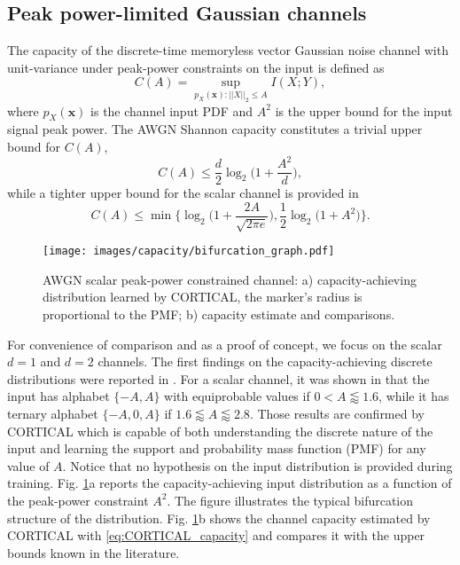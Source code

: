 \subsection{Peak power-limited Gaussian channels}
The capacity of the discrete-time memoryless vector Gaussian noise channel with unit-variance under peak-power constraints on the input is defined as \cite{Rassouli2016}
\begin{equation}
C(A) = \sup_{p_X(\mathbf{x}): ||X||_2\leq A} I(X;Y),
\end{equation}
where $p_X(\mathbf{x})$ is the channel input PDF and $A^2$ is the upper bound for the input signal peak power.
The AWGN Shannon capacity constitutes a trivial upper bound for $C(A)$,
\begin{equation}
C(A) \leq \frac{d}{2}\log_2\biggl(1+\frac{A^2}{d}\biggr),
\end{equation}
while a tighter upper bound for the scalar channel is provided in \cite{McKellips2004}
\begin{equation}
C(A) \leq \min\biggl\{\log_2\biggl(1+\frac{2A}{\sqrt{2\pi e}}\biggr), \frac{1}{2}\log_2\bigl(1+A^2\bigr) \biggr\}.
\end{equation}
\begin{figure}
	\centering
	\texttt{[image: images/capacity/bifurcation\_graph.pdf]}
	\caption{AWGN scalar peak-power constrained channel: a) capacity-achieving distribution learned by CORTICAL, the marker's radius is proportional to the PMF; b) capacity estimate and comparisons.}
	\label{fig:CORTICAL_bifurcation}
\end{figure} 
For convenience of comparison and as a proof of concept, we focus on the scalar $d=1$ and $d=2$ channels. 
The first findings on the capacity-achieving discrete distributions were reported in \cite{Smith1971}. For a scalar channel, it was shown in \cite{Sharma2010} that the input has alphabet $\{-A,A\}$ with equiprobable values if $0<A \lessapprox 1.6$, while it has ternary alphabet $\{-A,0,A\}$ if $1.6 \lessapprox A \lessapprox 2.8$.
Those results are confirmed by CORTICAL which is capable of both understanding the discrete nature of the input and learning the support and probability mass function (PMF) for any value of $A$. Notice that no hypothesis on the input distribution is provided during training. Fig. \ref{fig:CORTICAL_bifurcation}a reports the capacity-achieving input distribution as a function of the peak-power constraint $A^2$. The figure illustrates the typical bifurcation structure of the distribution. Fig. \ref{fig:CORTICAL_bifurcation}b shows the channel capacity estimated by CORTICAL with \eqref{eq:CORTICAL_capacity} and compares it with the upper bounds known in the literature.  

